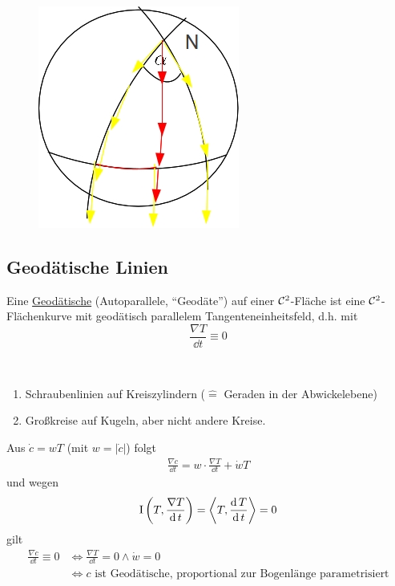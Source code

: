 \begin{bsp}
\begin{figure}[ht]
 \centering
\includegraphics[scale=0.3]{Bilder/Bsp13}
\end{figure}
\end{bsp}

\subsection{Geodätische Linien}
\begin{definition}
 Eine \uline{Geodätische} (Autoparallele, ``Geodäte'') auf einer \(\mathcal{C}^2\)-Fläche ist eine \(\mathcal{C}^2\)-Flächenkurve mit geodätisch parallelem Tangenteneinheitsfeld, d.h. mit
 \[
  \boxed{\frac{\nabla T}{\dd t} \equiv 0}
 \]
\end{definition}
\begin{bsp} \(\)
 \begin{enumerate}
  \item Schraubenlinien auf Kreiszylindern (\(\widehat{=}\) Geraden in der Abwickelebene)
  \item Großkreise auf Kugeln, aber nicht andere Kreise.
 \end{enumerate}
\end{bsp}
Aus \(\dot c = w T\) (mit \(w = |\dot c|\)) folgt 
\begin{align*}
 \frac{\nabla \dot c}{\dd t} = w \cdot \frac{\nabla T}{\dd t} + \dot w T
\end{align*}
und wegen 
\[ 
\Rom 1 \left(T, \frac{\nabla T}{\dd t}\right) = \left\langle T, \frac{\dd T}{\dd t} \right\rangle = 0
\]
gilt
 \begin{align*}
  \frac{\nabla \dot c}{\dd t} \equiv 0 &\Leftrightarrow \frac{\nabla T}{\dd t} = 0 \land \dot w = 0 \\
  &\Leftrightarrow c \text{ ist Geodätische, proportional zur Bogenlänge parametrisiert}
 \end{align*}

